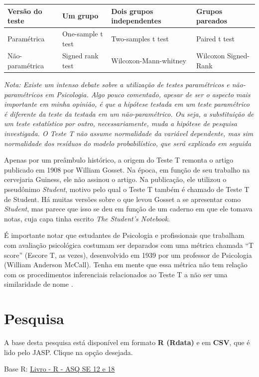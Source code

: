 \documentclass[
]{book}
\begin{document}
\begin{longtable}[]{@{}llll@{}}
\toprule
Versão do teste & Um grupo & Dois grupos independentes & Grupos pareados\tabularnewline
\midrule
\endhead
Paramétrica & One-sample t test & Two-samples t test & Paired t test\tabularnewline
Não-paramétrica & Signed rank test & Wilcoxon-Mann-whitney & Wilcoxon Signed-Rank\tabularnewline
\bottomrule
\end{longtable}

\emph{Nota: Existe um intenso debate sobre a utilização de testes paramétricos e não-paramétricos em Psicologia. Algo pouco comentado, apesar de ser o aspecto mais importante em minha opinião, é que a hipótese testada em um teste paramétrico é diferente da teste da testada em um não-paramétrico. Ou seja, a substituição de um teste estatístico por outro, necessariamente, muda a hipótese de pesquisa investigada. O Teste T não assume normalidade da variável dependente, mas sim normalidade dos resíduos do modelo probabilístico, que será explicado em seguida}

Apenas por um preâmbulo histórico, a origem do Teste T remonta o artigo publicado em 1908 por William Gosset. Na época, em função de seu trabalho na cervejaria Guiness, ele não assinou o artigo. Na publicação, ele utilizou o pseudônimo \emph{Student}, motivo pelo qual o Teste T também é chamado de Teste T de Student. Há muitas versões sobre o que levou Gosset a se apresentar como \emph{Student}, mas parece que isso se deu em função de um caderno em que ele tomava notas, cuja capa tinha escrito \emph{The Student's Notebook}.

É importante notar que estudantes de Psicologia e profissionais que trabalham com avaliação psicológica costumam ser deparados com uma métrica chamada ``T score'' (Escore T, as vezes), desenvolvido em 1939 por um professor de Psicologia (William Anderson McCall). Tenha em mente que essa métrica não tem relação com os procedimentos inferenciais relacionados ao Teste T a não ser uma similaridade de nome \citep{Krus1977}.

\hypertarget{pesquisa-3}{%
\section{Pesquisa}\label{pesquisa-3}}

A base desta pesquisa está disponível em formato \textbf{R (Rdata)} e em \textbf{CSV}, que é lido pelo JASP. Clique na opção desejada.

Base R: \href{https://github.com/anovabr/mqt/raw/master/bases/Livro\%20-\%20R\%20-\%20ASQ\%20SE\%2012\%20e\%2018.RData}{Livro - R - ASQ SE 12 e 18}
\end{document}
